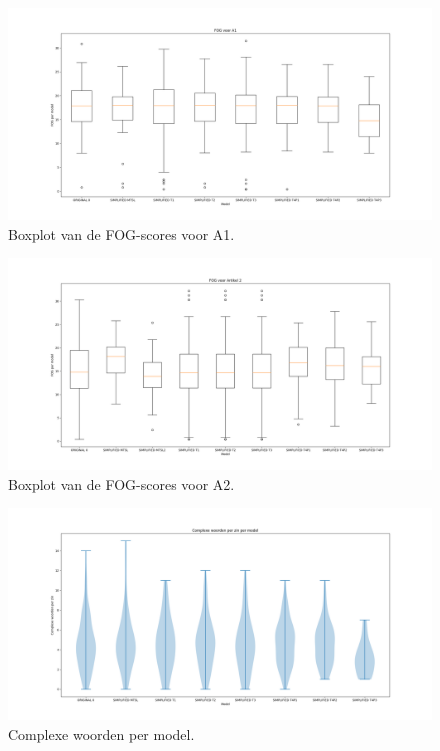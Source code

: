 \begin{figure}
	\includegraphics[width=\linewidth]{img/boxplot-fog-a1.png}
	\caption{Boxplot van de FOG-scores voor A1.}
	\label{img:boxplot-fog-a1}
\end{figure}

\begin{figure}
	\includegraphics[width=\linewidth]{img/boxplot-fog-a2.png}
	\caption{Boxplot van de FOG-scores voor A2.}
	\label{img:boxplot-fog-a2}
\end{figure}


\begin{figure}
	\includegraphics[width=\linewidth]{img/violinplot-complex-a1.png}
	\caption{Complexe woorden per model.}
	\label{img:violinplot-complex-a1}
\end{figure}

